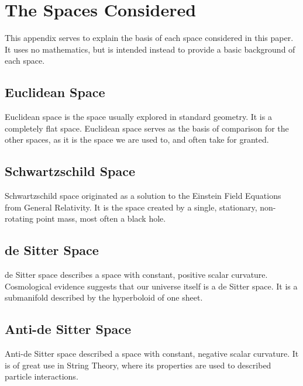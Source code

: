\documentclass{article}
\begin{document}
\newpage
\appendix
\section{The Spaces Considered}
This appendix serves to explain the basis of each space considered in this paper. It uses no mathematics, but is intended instead to provide a basic background of each space.

\subsection{Euclidean Space}
Euclidean space is the space usually explored in standard geometry. It is a completely flat space. Euclidean space serves as the basis of comparison for the other spaces, as it is the space we are used to, and often take for granted.

\subsection{Schwartzschild Space}
Schwartzschild space originated as a solution to the Einstein Field Equations from General Relativity. It is the space created by a single, stationary, non-rotating point mass, most often a black hole.

\subsection{de Sitter Space}
de Sitter space describes a space with constant, positive scalar curvature. Cosmological evidence suggests that our universe itself is a de Sitter space. It is a submanifold described by the hyperboloid of one sheet.

\subsection{Anti-de Sitter Space}
Anti-de Sitter space described a space with constant, negative scalar curvature. It is of great use in String Theory, where its properties are used to described particle interactions.
\end{document}
